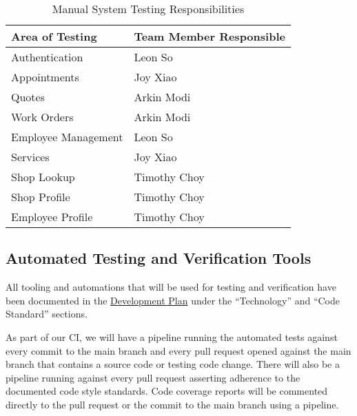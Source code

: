 \documentclass[12pt, titlepage]{article}
\begin{document}
\begin{table}[H]
	\centering
	\caption{Manual System Testing Responsibilities}
	\vspace{5pt}
	\begin{tabular}{|p{}|p{}|}
		\hline
		\textbf{Area of Testing} & \textbf{Team Member Responsible} \\
		\hline
		Authentication           & Leon So                          \\
		\hline
		Appointments             & Joy Xiao                         \\
		\hline
		Quotes                   & Arkin Modi                       \\
		\hline
		Work Orders              & Arkin Modi                       \\
		\hline
		Employee Management      & Leon So                          \\
		\hline
		Services                 & Joy Xiao                         \\
		\hline
		Shop Lookup              & Timothy Choy                     \\
		\hline
		Shop Profile             & Timothy Choy                     \\
		\hline
		Employee Profile         & Timothy Choy                     \\
		\hline
	\end{tabular}

	\label{Manual System Testing Responsibilities}
\end{table}

\subsection{Automated Testing and Verification Tools} \label{Automated Testing and Verification Tools}

All tooling and automations that will be used for testing and verification have been documented in
the
\href{https://github.com/arkinmodi/project-sayyara/blob/main/docs/DevelopmentPlan/DevelopmentPlan.pdf}{Development
	Plan} under the ``Technology'' and ``Code Standard'' sections.

As part of our CI, we will have a pipeline running the automated tests against every commit to the
main branch and every pull request opened against the main branch that contains a source code or
testing code change. There will also be a pipeline running against every pull request asserting
adherence to the documented code style standards. Code coverage reports will be commented directly
to the pull request or the commit to the main branch using a pipeline.
\end{document}
